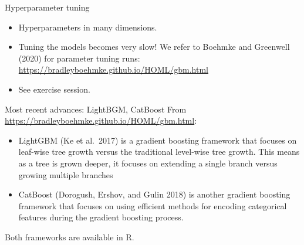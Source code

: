 \documentclass[
  10pt,
  ignorenonframetext,
]{beamer}
\providecommand{\tightlist}{%
  \setlength{\itemsep}{0pt}\setlength{\parskip}{0pt}}
\begin{document}
\begin{frame}
\begin{block}{Hyperparameter tuning}
\protect\hypertarget{hyperparameter-tuning}{}
\(~\)

\begin{itemize}
\tightlist
\item
  Hyperparameters in many dimensions.
\end{itemize}

\vspace{2mm}

\begin{itemize}
\tightlist
\item
  Tuning the models becomes very slow! We refer to Boehmke and Greenwell
  (2020) for parameter tuning runs:\\
  \url{https://bradleyboehmke.github.io/HOML/gbm.html}
\end{itemize}

\vspace{2mm}

\begin{itemize}
\tightlist
\item
  See exercise session.
\end{itemize}
\end{block}
\end{frame}

\begin{frame}{Most recent advances: LightBGM, CatBoost}
\protect\hypertarget{most-recent-advances-lightbgm-catboost}{}
From \url{https://bradleyboehmke.github.io/HOML/gbm.html}:

\begin{itemize}
\item
  LightGBM (Ke et al.~2017) is a gradient boosting framework that
  focuses on leaf-wise tree growth versus the traditional level-wise
  tree growth. This means as a tree is grown deeper, it focuses on
  extending a single branch versus growing multiple branches
\item
  CatBoost (Dorogush, Ershov, and Gulin 2018) is another gradient
  boosting framework that focuses on using efficient methods for
  encoding categorical features during the gradient boosting process.
\end{itemize}

Both frameworks are available in R.
\end{frame}
\end{document}
